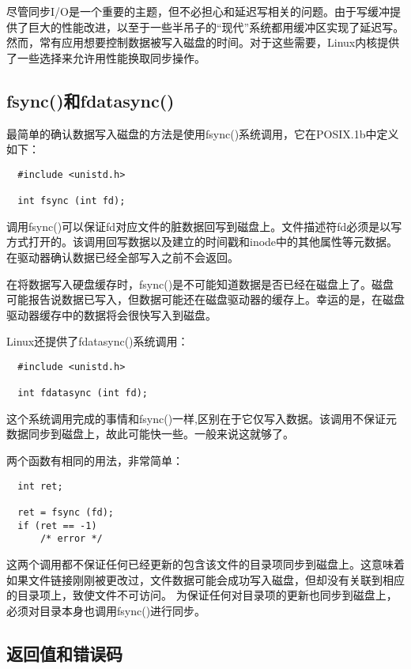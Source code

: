 尽管同步I/O是一个重要的主题，但不必担心和延迟写相关的问题。由于写缓冲提供了巨大的性能改进，以至于一些半吊子的“现代”系统都用缓冲区实现了延迟写。然而，常有应用想要控制数据被写入磁盘的时间。对于这些需要，Linux内核提供了一些选择来允许用性能换取同步操作。 

\subsection{fsync()和fdatasync()}

最简单的确认数据写入磁盘的方法是使用fsync()系统调用，它在POSIX.1b中定义如下：

\begin{lstlisting}
  #include <unistd.h>

  int fsync (int fd);
\end{lstlisting}

调用fsync()可以保证fd对应文件的脏数据回写到磁盘上。文件描述符fd必须是以写方式打开的。该调用回写数据以及建立的时间戳和inode中的其他属性等元数据。在驱动器确认数据已经全部写入之前不会返回。

在将数据写入硬盘缓存时，fsync()是不可能知道数据是否已经在磁盘上了。磁盘可能报告说数据已写入，但数据可能还在磁盘驱动器的缓存上。幸运的是，在磁盘驱动器缓存中的数据将会很快写入到磁盘。

Linux还提供了fdatasync()系统调用：

\begin{lstlisting}
  #include <unistd.h>

  int fdatasync (int fd);
\end{lstlisting}

这个系统调用完成的事情和fsync()一样,区别在于它仅写入数据。该调用不保证元数据同步到磁盘上，故此可能快一些。一般来说这就够了。

两个函数有相同的用法，非常简单： 

\begin{lstlisting}
  int ret;

  ret = fsync (fd);
  if (ret == -1)
      /* error */
\end{lstlisting}

这两个调用都不保证任何已经更新的包含该文件的目录项同步到磁盘上。这意味着如果文件链接刚刚被更改过，文件数据可能会成功写入磁盘，但却没有关联到相应的目录项上，致使文件不可访问。 为保证任何对目录项的更新也同步到磁盘上，必须对目录本身也调用fsync()进行同步。

\subsection{返回值和错误码}

